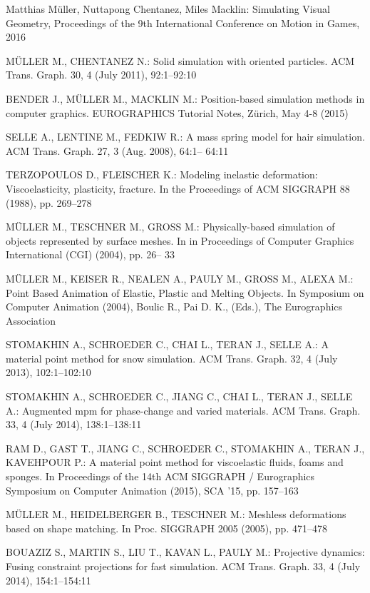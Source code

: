 \documentclass[
	11pt, 
	DIV10,
	a4paper, 
	oneside, 
	headings=normal, 
	captions=tableheading,
	final, 
	numbers=noenddot
]{scrartcl}
\begin{document}
\newpage

\begin{thebibliography}{15}
	Matthias Müller, Nuttapong Chentanez, Miles Macklin: Simulating Visual Geometry, Proceedings of the 9th International Conference on Motion in Games, 2016
	
	MÜLLER M., CHENTANEZ N.: Solid simulation with oriented
	particles. ACM Trans. Graph. 30, 4 (July 2011), 92:1–92:10
	
	BENDER J., MÜLLER M., MACKLIN M.: Position-based simulation
	methods in computer graphics. EUROGRAPHICS Tutorial
	Notes, Zürich, May 4-8 (2015)
	
	SELLE A., LENTINE M., FEDKIW R.: A mass spring model for
	hair simulation. ACM Trans. Graph. 27, 3 (Aug. 2008), 64:1–
	64:11
	
	TERZOPOULOS D., FLEISCHER K.: Modeling inelastic deformation:
	Viscoelasticity, plasticity, fracture. In the Proceedings of
	ACM SIGGRAPH 88 (1988), pp. 269–278
	
	MÜLLER M., TESCHNER M., GROSS M.: Physically-based simulation
	of objects represented by surface meshes. In in Proceedings
	of Computer Graphics International (CGI) (2004), pp. 26–
	33
	
	MÜLLER M., KEISER R., NEALEN A., PAULY M., GROSS M., ALEXA M.: Point Based Animation of Elastic, Plastic and Melting Objects. In Symposium on Computer Animation (2004), Boulic R., Pai D. K., (Eds.), The Eurographics Association
	
	STOMAKHIN A., SCHROEDER C., CHAI L., TERAN J., SELLE
	A.: A material point method for snow simulation. ACM Trans.
	Graph. 32, 4 (July 2013), 102:1–102:10
	
	STOMAKHIN A., SCHROEDER C., JIANG C., CHAI L., TERAN
	J., SELLE A.: Augmented mpm for phase-change and varied
	materials. ACM Trans. Graph. 33, 4 (July 2014), 138:1–138:11
	
	RAM D., GAST T., JIANG C., SCHROEDER C., STOMAKHIN
	A., TERAN J., KAVEHPOUR P.: A material point method
	for viscoelastic fluids, foams and sponges. In Proceedings of
	the 14th ACM SIGGRAPH / Eurographics Symposium on Computer
	Animation (2015), SCA ’15, pp. 157–163
	
	MÜLLER M., HEIDELBERGER B., TESCHNER M.: Meshless deformations
	based on shape matching. In Proc. SIGGRAPH 2005
	(2005), pp. 471–478
	
	BOUAZIZ S., MARTIN S., LIU T., KAVAN L., PAULY M.: Projective
	dynamics: Fusing constraint projections for fast simulation.
	ACM Trans. Graph. 33, 4 (July 2014), 154:1–154:11
	

\end{thebibliography}
\end{document}
